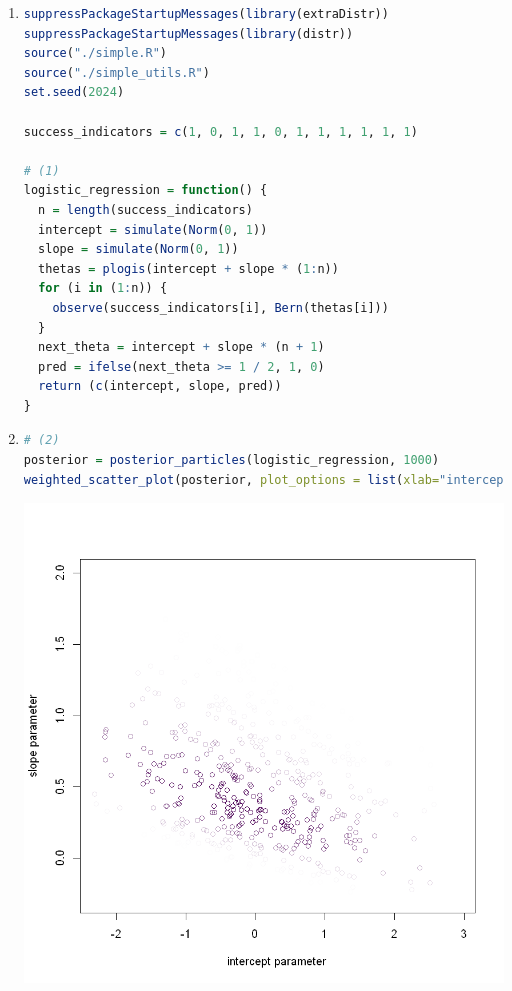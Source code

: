 \documentclass{article}
\begin{document}



\begin{enumerate}
\item 
\begin{lstlisting}[language=R]
suppressPackageStartupMessages(library(extraDistr))
suppressPackageStartupMessages(library(distr))
source("./simple.R")
source("./simple_utils.R")
set.seed(2024)

success_indicators = c(1, 0, 1, 1, 0, 1, 1, 1, 1, 1, 1)

# (1)
logistic_regression = function() {
  n = length(success_indicators)
  intercept = simulate(Norm(0, 1))
  slope = simulate(Norm(0, 1))
  thetas = plogis(intercept + slope * (1:n))
  for (i in (1:n)) {
    observe(success_indicators[i], Bern(thetas[i]))
  }
  next_theta = intercept + slope * (n + 1)
  pred = ifelse(next_theta >= 1 / 2, 1, 0)
  return (c(intercept, slope, pred))
}
\end{lstlisting}



\item \begin{lstlisting}[language=R]
# (2)
posterior = posterior_particles(logistic_regression, 1000)
weighted_scatter_plot(posterior, plot_options = list(xlab="intercept parameter", ylab="slope parameter"))
\end{lstlisting}
\includegraphics[width=\textwidth]{int_slope.png}




\end{enumerate}
\end{document}
